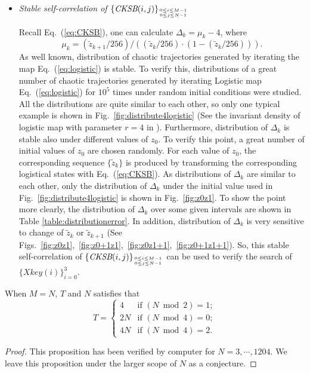 \documentclass[twocolumn]{svjour3}
\begin{document}
\begin{itemize}
\item \textit{Stable self-correlation of $\{\textit{CKSB}(i,j)\}_{0\leq i\leq M-1 \atop 0\leq j\leq N-1}$}

Recall Eq.~(\ref{eq:CKSB}), one can calculate $\Delta_k=\mu_k-4$, where
\begin{equation*}
\mu_k=(\tilde{z}_{k+1}/256)/((\tilde{z}_k/256)\cdot(1-(\tilde{z}_k/256))).
\end{equation*}
As well known, distribution of chaotic trajectories generated by iterating the map Eq.~(\ref{eq:logistic}) is stable. To verify this,
distributions of a great number of chaotic trajectories generated by iterating Logistic map Eq.~(\ref{eq:logistic}) for $10^5$ times under random initial conditions were
studied. All the distributions are quite similar to each other, so only one typical example is shown in Fig.~\ref{fig:distribute4logistic}
(See the invariant density of logistic map with parameter $r=4$ in \cite[Fig.~2]{Oteo:DoublePlogistic:PRE07}). Furthermore, distribution of $\Delta_k$ is stable also under different values of $z_0$. To verify this point, a great number of initial values of $z_0$ are chosen randomly. For each value of $z_0$, the corresponding
sequence $\{\tilde{z}_k\}$ is produced by transforming the corresponding logistical states with Eq.~(\ref{eq:CKSB}). As distributions of $\Delta_k$ are similar to each other, only the distribution of $\Delta_k$ under the initial value used in Fig.~\ref{fig:distribute4logistic} is shown in Fig.~\ref{fig:z0z1}. To show the point more clearly, the distribution of $\Delta_k$ over some given intervals are shown in
Table \ref{table:distributionerror}. In addition,
distribution of $\Delta_k$ is very sensitive to change of $\tilde{z}_k$ or $\tilde{z}_{k+1}$ (See Figs.~\ref{fig:z0z1},~\ref{fig:z0+1z1},~\ref{fig:z0z1+1},~\ref{fig:z0+1z1+1}).
So, this stable self-correlation of $\{\textit{CKSB}(i,j)\}_{0\leq i\leq M-1 \atop 0\leq j\leq N-1}$ can be used to verify the search of $\{\textit{Xkey}(i)\}_{i=0}^3$.
\end{itemize}

\begin{proposition}
When $M=N$, $T$ and $N$ satisfies that
\begin{equation}
 T= \begin{cases}
   4   &   \mbox{if }(N\bmod 2)=1;\\
   2N  &   \mbox{if }(N\bmod 4)=0;\\
   4N  &   \mbox{if }(N\bmod 4)=2.
  \end{cases}
\end{equation}
\label{prop:period}
\end{proposition}
\begin{proof}
This proposition has been verified by computer for $N=3, \cdots, 1204$. We leave
this proposition under the larger scope of $N$ as a conjecture.
\end{proof}
\end{document}
